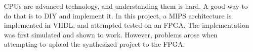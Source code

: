 CPUs are advanced technology, and understanding them is hard. A good way to
do that is to DIY and implement it. In this project, a MIPS
architecture is implemented in VHDL, and attempted tested on an FPGA. The
implementation was first simulated and shown to work. However, problems arose
when attempting to upload the synthesized project to the FPGA.
